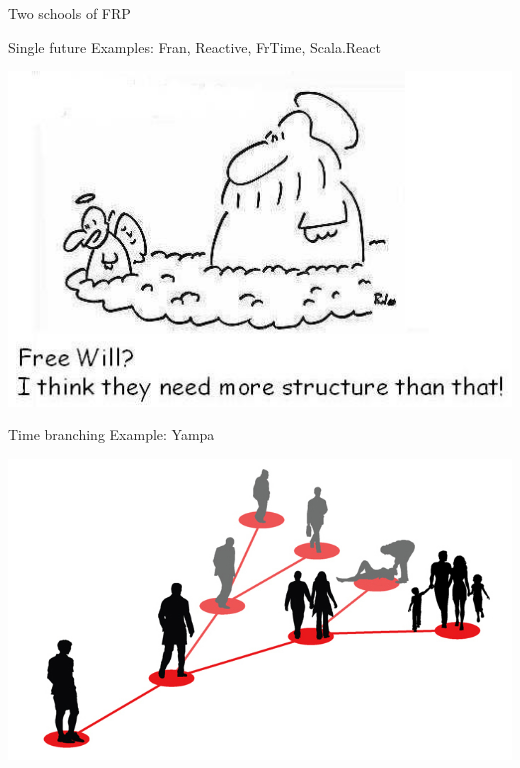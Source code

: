 \documentclass{beamer}
\begin{document}
\begin{frame}{Two schools of FRP}

\begin{block}{Single future}
Examples: Fran, Reactive, FrTime, Scala.React \\
\vspace{-0.3cm}
\begin{center}
\includegraphics[scale=0.25]{free-will.jpg}
\end{center}
\vspace{-0.5cm}
\end{block}
\begin{block}{Time branching}
Example: Yampa
\vspace{-0.3cm}
\begin{center}
\includegraphics[scale=0.15]{many-worlds.png}
\end{center}
\vspace{-0.2cm}
\end{block}

\end{frame}
\end{document}
